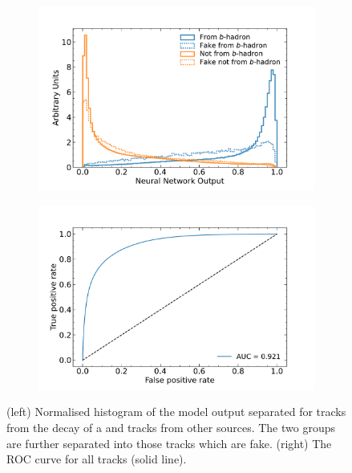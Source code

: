 \begin{figure}[!htbp]
  \centering
  \begin{subfigure}[b]{0.48\textwidth}
      \centering
      \includegraphics[width=\textwidth]{chapters/track_classifier/figs/b_id_output.pdf}
  \end{subfigure}
  \quad
  \begin{subfigure}[b]{0.48\textwidth}
      \centering
      \includegraphics[width=\textwidth]{chapters/track_classifier/figs/b_id_roc.pdf}
  \end{subfigure}
  \caption{
    (left) Normalised histogram of the model output separated for tracks from the decay of a \bhadron and tracks from other sources.
    The two groups are further separated into those tracks which are fake.
    (right) The ROC curve for all tracks (solid line).
  }
  \label{fig:b_id_output_roc}
\end{figure}


